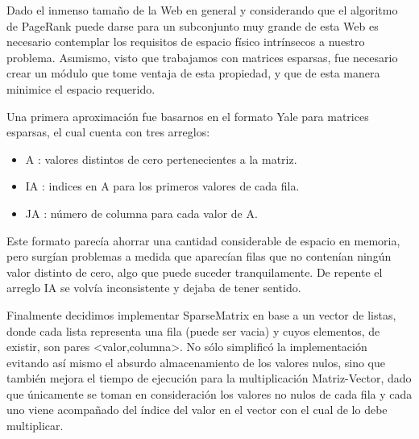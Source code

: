 Dado el inmenso tama\~no de la Web en general y considerando que el algoritmo de PageRank puede darse para un subconjunto muy grande de esta Web es necesario contemplar los requisitos de espacio f\'isico intr\'insecos a nuestro problema. As\i mismo, visto que trabajamos con matrices esparsas, fue necesario crear un m\'odulo que tome ventaja de esta propiedad, y que de esta manera minimice el espacio requerido.


Una primera aproximaci\'on fue basarnos en el formato Yale para matrices esparsas, el cual cuenta con tres arreglos:
\begin{itemize}
	\item A : valores distintos de cero pertenecientes a la matriz.
	\item IA : indices en A para los primeros valores de cada fila.
	\item JA : n\'umero de columna para cada valor de A.
\end{itemize}

Este formato parec\'ia ahorrar una cantidad considerable de espacio en memoria, pero surg\'ian problemas a medida que aparec\'ian filas que no conten\'ian ning\'un valor distinto de cero, algo que puede suceder tranquilamente. De repente el arreglo IA se volv\'ia inconsistente y dejaba de tener sentido.


Finalmente decidimos implementar SparseMatrix en base a un vector de listas, donde cada lista representa una fila (puede ser vacia) y cuyos elementos, de existir, son pares <valor,columna>. No s\'olo simplific\'o la implementaci\'on evitando as\'i mismo el absurdo almacenamiento de los valores nulos, sino que tambi\'en mejora el tiempo de ejecuci\'on para la multiplicaci\'on Matriz-Vector, dado que \'unicamente se toman en consideraci\'on los valores no nulos de cada fila y cada uno viene acompa\~nado del \'indice del valor en el vector con el cual de lo debe multiplicar.
